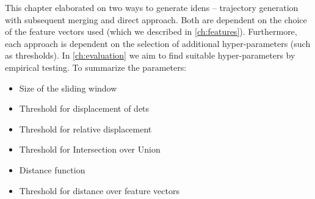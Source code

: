 This chapter elaborated on two ways to generate \glspl{iden} -- trajectory generation with subsequent merging and direct approach. Both are dependent on the choice of the feature vectors used (which we described in \autoref{ch:features}). Furthermore, each approach is dependent on the selection of additional hyper-parameters (such as thresholds). In \autoref{ch:evaluation} we aim to find suitable hyper-parameters by empirical testing. To summarize the parameters:

\begin{itemize}
    \item Size of the sliding window
    \item Threshold for displacement of \glspl{det}
    \item Threshold for relative displacement
    \item Threshold for Intersection over Union
    \item Distance function
    \item Threshold for distance over feature vectors
\end{itemize}